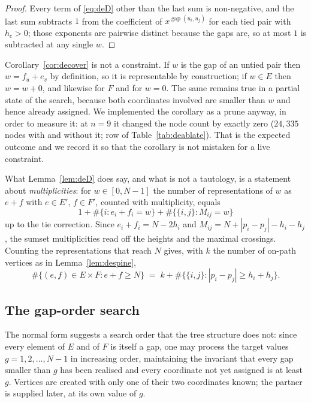 \begin{proof}
Every term of \eqref{eq:deD} other than the last sum is non-negative, and the
last sum subtracts $1$ from the coefficient of $x^{\operatorname{gap}(u_i,u_j)}$
for each tied pair with $h_c>0$; those exponents are pairwise distinct because
the gaps are, so at most $1$ is subtracted at any single $w$.
\end{proof}

\begin{remark}\label{rem:decaveat}
Corollary~\ref{cor:decover} is not a constraint.  If $w$ is the gap of an untied
pair then $w=f_u+e_v$ by definition, so it is representable by construction; if
$w\in E$ then $w=w+0$, and likewise for $F$ and for $w=0$.  The same remains
true in a partial state of the search, because both coordinates involved are
smaller than $w$ and hence already assigned.  We implemented the corollary as a
prune anyway, in order to measure it: at $n=9$ it changed the node count by
exactly zero ($24{,}335$ nodes with and without it; row  of
Table~\ref{tab:deablate}).  That is the expected outcome and we record it so
that the corollary is not mistaken for a live constraint.

What Lemma~\ref{lem:deD} does say, and what is not a tautology, is a statement
about \emph{multiplicities}: for $w\in[0,N-1]$ the number of representations of
$w$ as $e+f$ with $e\in E'$, $f\in F'$, counted with multiplicity, equals
\[
  1+\#\{i:e_i+f_i=w\}+\#\{\{i,j\}:M_{ij}=w\}
\]
up to the tie correction.  Since $e_i+f_i=N-2h_i$ and
$M_{ij}=N+|p_i-p_j|-h_i-h_j$, the sumset multiplicities read off the heights and
the maximal crossings.  Counting the representations that reach $N$ gives, with
$k$ the number of on-path vertices as in Lemma~\ref{lem:despine},
\[
  \#\{(e,f)\in E\times F: e+f\ge N\}
  \;=\;k+\#\bigl\{\{i,j\}:|p_i-p_j|\ge h_i+h_j\bigr\}.
\]
\end{remark}

\subsection{The gap-order search}\label{sec:de:search}

The normal form suggests a search order that the tree structure does not: since
every element of $E$ and of $F$ is itself a gap, one may process the target
values $g=1,2,\dots,N-1$ in increasing order, maintaining the invariant that
every gap smaller than $g$ has been realised and every coordinate not yet
assigned is at least $g$.  Vertices are created with only one of their two
coordinates known; the partner is supplied later, at its own value of $g$.

